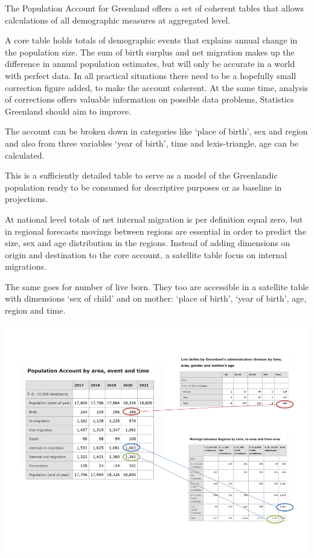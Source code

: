 \documentclass[USenglish]{article}
\begin{document}
The Population Account for Greenland offers a set of coherent tables that allows calculations of all demographic measures at aggregated level.

A core table holds totals of demographic events that  explains annual change in the population size. The sum of birth surplus and net migration makes up the difference in annual population estimates, but will only be accurate in a world with perfect data. In all practical situations there need to be a hopefully small correction figure added, to make the account coherent. At the same time, analysis of corrections offers valuable information on possible data problems, Statistics Greenland should aim to improve.

The account can be broken down in categories like ‘place of birth’, sex and region and also from three variables ‘year of birth’, time and lexis-triangle, age can be calculated. 

This is a sufficiently detailed table to serve as a model of the Greenlandic population ready to be consumed for descriptive purposes or as baseline in projections.

At national level totals of net internal migration is per definition equal zero, but in regional forecasts movings between regions are essential in order to predict the size, sex and age distribution in the regions. Instead of adding dimensions on origin and destination to the core account, a satellite table focus on internal migrations.

The same goes for number of live born. They too are accessible in a satellite table with dimensions ‘sex of child’ and on mother: ‘place of birth’, ‘year of birth’, age, region and time.



\includegraphics[scale=0.4]{images/PopulationAccountCoreSatellite}
\end{document}
